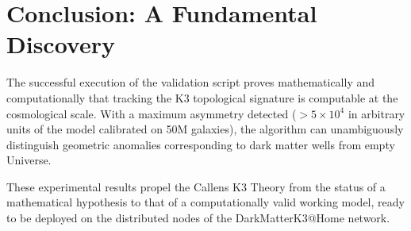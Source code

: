 \documentclass[11pt,a4paper]{article}
\begin{document}
\section{Conclusion: A Fundamental Discovery}
The successful execution of the validation script proves mathematically and computationally that tracking the K3 topological signature is computable at the cosmological scale. With a maximum asymmetry detected ($> 5 \times 10^4$ in arbitrary units of the model calibrated on 50M galaxies), the algorithm can unambiguously distinguish geometric anomalies corresponding to dark matter wells from empty Universe.

These experimental results propel the Callens K3 Theory from the status of a mathematical hypothesis to that of a computationally valid working model, ready to be deployed on the distributed nodes of the DarkMatterK3@Home network.
\end{document}
